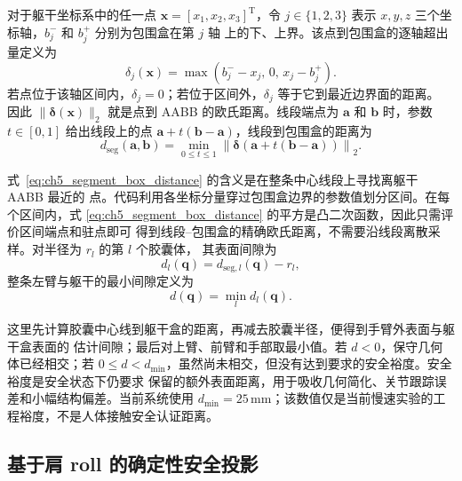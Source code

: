 对于躯干坐标系中的任一点 $\boldsymbol x=[x_1,x_2,x_3]^{\mathrm T}$，令
$j\in\{1,2,3\}$ 表示 $x,y,z$ 三个坐标轴，$b_j^-$ 和 $b_j^+$ 分别为包围盒在第 $j$ 轴
上的下、上界。该点到包围盒的逐轴超出量定义为
\begin{equation}
  \delta_j(\boldsymbol x)=
  \max\!\left(b_j^- -x_j,\,0,\,x_j-b_j^+\right).
  \label{eq:ch5_point_box_delta}
\end{equation}
若点位于该轴区间内，$\delta_j=0$；若位于区间外，$\delta_j$ 等于它到最近边界面的距离。
因此 $\|\boldsymbol\delta(\boldsymbol x)\|_2$ 就是点到 AABB 的欧氏距离。线段端点为
$\boldsymbol a$ 和 $\boldsymbol b$ 时，参数 $t\in[0,1]$ 给出线段上的点
$\boldsymbol a+t(\boldsymbol b-\boldsymbol a)$，线段到包围盒的距离为
\begin{equation}
  d_{\mathrm{seg}}(\boldsymbol a,\boldsymbol b)=
  \min_{0\le t\le1}
  \left\|
    \boldsymbol\delta\!\left(
    \boldsymbol a+t(\boldsymbol b-\boldsymbol a)\right)
  \right\|_2.
  \label{eq:ch5_segment_box_distance}
\end{equation}

式~\eqref{eq:ch5_segment_box_distance} 的含义是在整条中心线段上寻找离躯干 AABB 最近的
点。代码利用各坐标分量穿过包围盒边界的参数值划分区间。在每个区间内，式
\eqref{eq:ch5_segment_box_distance} 的平方是凸二次函数，因此只需评价区间端点和驻点即可
得到线段--包围盒的精确欧氏距离，不需要沿线段离散采样。对半径为 $r_l$ 的第 $l$ 个胶囊体，
其表面间隙为
\begin{equation}
  d_l(\boldsymbol q)=d_{\mathrm{seg},l}(\boldsymbol q)-r_l,
  \label{eq:ch5_capsule_clearance}
\end{equation}
整条左臂与躯干的最小间隙定义为
\begin{equation}
  d(\boldsymbol q)=\min_l d_l(\boldsymbol q).
  \label{eq:ch5_arm_torso_clearance}
\end{equation}

这里先计算胶囊中心线到躯干盒的距离，再减去胶囊半径，便得到手臂外表面与躯干盒表面的
估计间隙；最后对上臂、前臂和手部取最小值。若 $d<0$，保守几何体已经相交；若
$0\le d<d_{\min}$，虽然尚未相交，但没有达到要求的安全裕度。安全裕度是安全状态下仍要求
保留的额外表面距离，用于吸收几何简化、关节跟踪误差和小幅结构偏差。当前系统使用
$d_{\min}=25\,\mathrm{mm}$；该数值仅是当前慢速实验的工程裕度，不是人体接触安全认证距离。

\subsection{基于肩 roll 的确定性安全投影}
\label{subsec:ch5_collision_projection}


